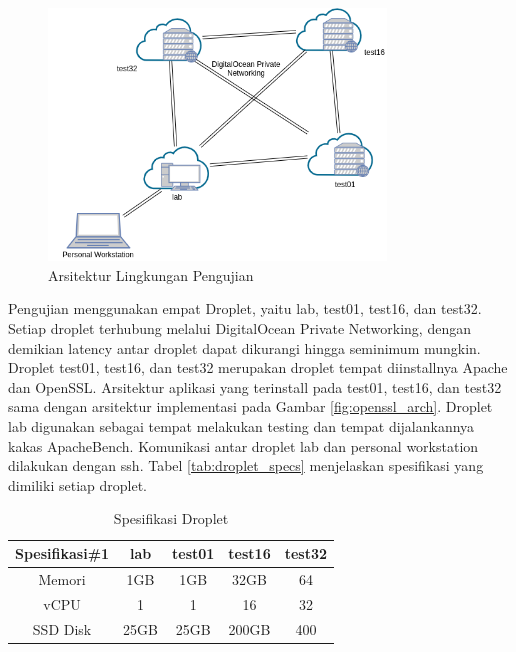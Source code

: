 \begin{figure}[h]
  \centering
  \includegraphics[width=0.8\textwidth]{resources/ch-4/testing_arch.png}
  \caption{Arsitektur Lingkungan Pengujian}
  \label{fig:testing_arch}
\end{figure}

Pengujian menggunakan empat Droplet, yaitu lab, test01, test16, dan test32. Setiap droplet terhubung melalui DigitalOcean Private Networking, dengan demikian latency antar droplet dapat dikurangi hingga seminimum mungkin. Droplet test01, test16, dan test32 merupakan droplet tempat diinstallnya Apache dan OpenSSL. Arsitektur aplikasi yang terinstall pada test01, test16, dan test32 sama dengan arsitektur implementasi pada Gambar \ref{fig:openssl_arch}. Droplet lab digunakan sebagai tempat melakukan testing dan tempat dijalankannya kakas ApacheBench. Komunikasi antar droplet lab dan personal workstation dilakukan dengan ssh. Tabel \ref{tab:droplet_specs} menjelaskan spesifikasi yang dimiliki setiap droplet.

\begin{table}[ht]
\caption{Spesifikasi Droplet} %
\label{tab:droplet_specs}
\centering %
\begin{tabular}{|| c | c c c c ||} %
\hline\hline %
Spesifikasi\#1 & lab & test01 & test16 & test32\\[0.5ex] %
\hline %
Memori    & 1GB   & 1GB   & 32GB  & 64 \\
vCPU      & 1     & 1     & 16    & 32 \\
SSD Disk  & 25GB  & 25GB  & 200GB & 400 \\ [1ex] %
\hline\hline %
\end{tabular}
\label{table:nonlin} %
\end{table}

